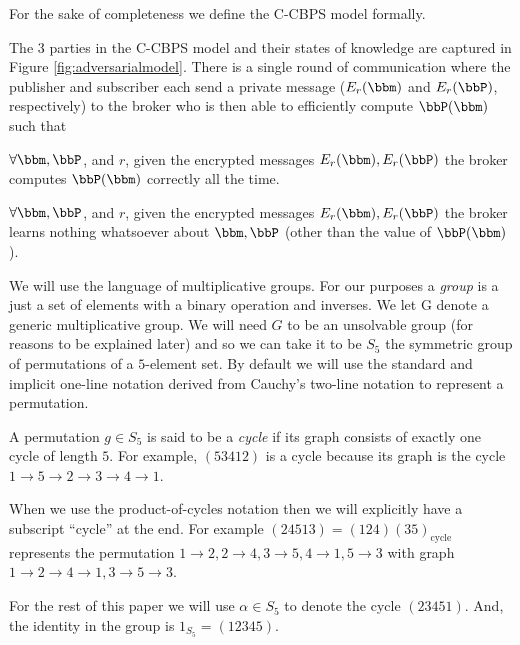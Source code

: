 For the sake of completeness we define the C-CBPS model formally.
\begin{definition}[C-CBPS]
The 3  parties in the C-CBPS  model and their states  of knowledge are
captured in Figure \ref{fig:adversarialmodel}. There is a single round
of  communication  where the  publisher  and  subscriber  each send  a
private  message ($E_r(\bbm)$  and $E_r(\bbP)$,  respectively)  to the
broker who is then able to efficiently compute $\bbP(\bbm)$ such that

  $\forall \bbm,  \bbP$, and $r$,  given the
encrypted   messages  $E_r(\bbm),   E_r(\bbP)$  the   broker  computes
$\bbP(\bbm)$ correctly all the time.

  $\forall \bbm,  \bbP$,  and  $r$, given  the
encrypted  messages $E_r(\bbm), E_r(\bbP)$  the broker  learns nothing
whatsoever about $\bbm, \bbP$ (other than the value of $\bbP(\bbm)$).

\end{definition}


We will use the language  of multiplicative groups. For our purposes a
\emph{group} is a  just a set of elements with  a binary operation and
inverses. We  let G  denote a generic  multiplicative group.   We will
need $G$ to be an unsolvable group (for reasons to be explained later)
and so we can take it  to be $S_5$ the symmetric group of permutations
of  a  $5$-element set.   By  default we  will  use  the standard  and
implicit  one-line notation  derived from  Cauchy's  two-line notation
\cite{WikiPermNotation} to represent a permutation.
\begin{definition} [Cycle]
A permutation  $g \in S_5$ is said  to be a \emph{cycle}  if its graph
consists of  exactly one cycle of length  $5$. For example, $(5  3 4 1
2)$  is a  cycle  because its  graph  is the  cycle  $1 \rightarrow  5
\rightarrow 2 \rightarrow 3 \rightarrow 4 \rightarrow 1$.
\end{definition}

When  we use the  product-of-cycles notation  then we  will explicitly
have a subscript ``cycle'' at the end.   For example $(2 4 5 1 3) = (1
2 4)(3 5)_{\mbox{cycle}}$ represents the permutation $1 \rightarrow 2,
2 \rightarrow  4, 3 \rightarrow 5,  4 \rightarrow 1,  5 \rightarrow 3$
with graph $1 \rightarrow 2 \rightarrow 4 \rightarrow 1, 3 \rightarrow
5 \rightarrow 3$.

For the rest of this paper we  will use $\alpha \in S_5$ to denote the
cycle $(23451)$. And, the identity in the group is $1_{S_5} = (1 2 3 4
5)$.


